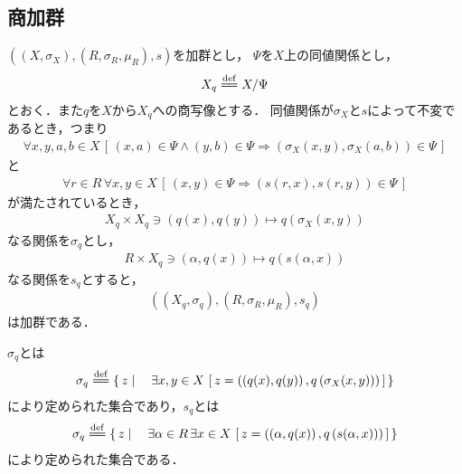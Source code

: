 \subsection{商加群}
	\begin{screen}
		\begin{thm}[商加群]\label{thm:quotient_module}
			$\left(\left(X,\sigma_X\right),\left(R,\sigma_R,\mu_R\right),s\right)$を加群とし，
			$\Psi$を$X$上の同値関係とし，
			\begin{align}
				X_q \defeq X/\Psi
			\end{align}
			とおく．また$q$を$X$から$X_q$への商写像とする．
			同値関係が$\sigma_X$と$s$によって不変であるとき，つまり
			\begin{align}
				\forall x,y,a,b \in X\,
				\left[\, (x,a) \in \Psi \wedge (y,b) \in \Psi \Longrightarrow 
				\left(\sigma_X(x,y), \sigma_X(a,b)\right) \in \Psi\, \right]
				\label{fom:thm_quotient_module_1}
			\end{align}
			と
			\begin{align}
				\forall r \in R\, \forall x,y \in X\,
				\left[\, (x,y) \in \Psi \Longrightarrow 
				\left(s(r,x), s(r,y)\right) \in \Psi\, \right]
				\label{fom:thm_quotient_module_2}
			\end{align}
			が満たされているとき，
			\begin{align}
				X_q \times X_q \ni \left(q(x),q(y)\right) \longmapsto q\left(\sigma_X(x,y)\right)
			\end{align}
			なる関係を$\sigma_q$とし，
			\begin{align}
				R \times X_q \ni \left(\alpha,q(x)\right) \longmapsto q\left(s(\alpha,x)\right)
			\end{align}
			なる関係を$s_q$とすると，
			\begin{align}
				\left(\left(X_q,\sigma_q\right),\left(R,\sigma_R,\mu_R\right),s_q\right)
			\end{align}
			は加群である．
		\end{thm}
	\end{screen}
	
	$\sigma_q$とは
	\begin{align}
		\sigma_q \defeq \Set{z}{\exists x,y \in X\, 
		\left[\, z=\left(\left(q(x),q(y)\right),q\left(\sigma_X(x,y)\right)\right)\, \right]}
	\end{align}
	により定められた集合であり，$s_q$とは
	\begin{align}
		\sigma_q \defeq \Set{z}{\exists \alpha \in R\, \exists x \in X\, 
		\left[\, z=\left(\left(\alpha,q(x)\right),q\left(s(\alpha,x)\right)\right)\, \right]}
	\end{align}
	により定められた集合である．
	
